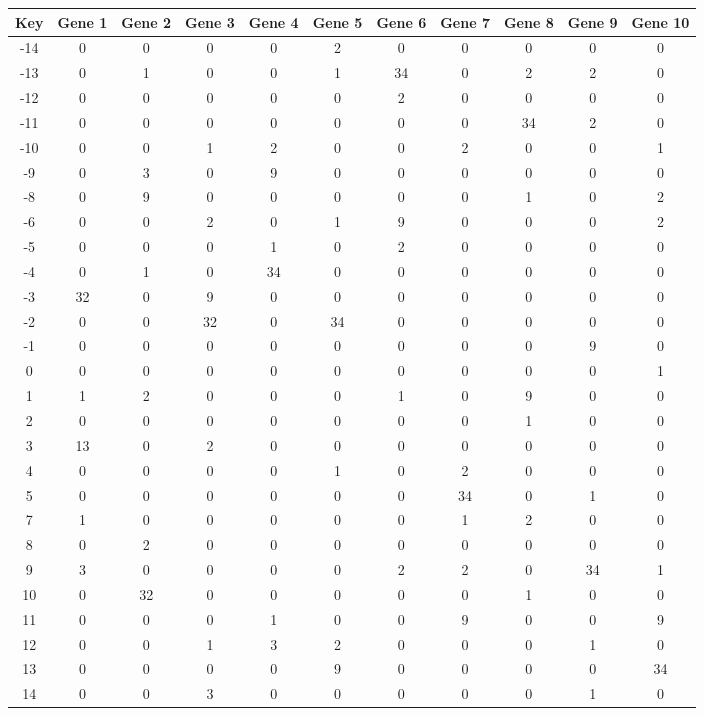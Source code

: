 \begin{tabular}{|c|c|c|c|c|c|c|c|c|c|c|}
\hline
Key & Gene 1 & Gene 2 & Gene 3 & Gene 4 & Gene 5 & Gene 6 & Gene 7 & Gene 8 & Gene 9 & Gene 10 \\
\hline
-14 & 0 & 0 & 0 & 0 & 2 & 0 & 0 & 0 & 0 & 0 \\
-13 & 0 & 1 & 0 & 0 & 1 & 34 & 0 & 2 & 2 & 0 \\
-12 & 0 & 0 & 0 & 0 & 0 & 2 & 0 & 0 & 0 & 0 \\
-11 & 0 & 0 & 0 & 0 & 0 & 0 & 0 & 34 & 2 & 0 \\
-10 & 0 & 0 & 1 & 2 & 0 & 0 & 2 & 0 & 0 & 1 \\
-9 & 0 & 3 & 0 & 9 & 0 & 0 & 0 & 0 & 0 & 0 \\
-8 & 0 & 9 & 0 & 0 & 0 & 0 & 0 & 1 & 0 & 2 \\
-6 & 0 & 0 & 2 & 0 & 1 & 9 & 0 & 0 & 0 & 2 \\
-5 & 0 & 0 & 0 & 1 & 0 & 2 & 0 & 0 & 0 & 0 \\
-4 & 0 & 1 & 0 & 34 & 0 & 0 & 0 & 0 & 0 & 0 \\
-3 & 32 & 0 & 9 & 0 & 0 & 0 & 0 & 0 & 0 & 0 \\
-2 & 0 & 0 & 32 & 0 & 34 & 0 & 0 & 0 & 0 & 0 \\
-1 & 0 & 0 & 0 & 0 & 0 & 0 & 0 & 0 & 9 & 0 \\
0 & 0 & 0 & 0 & 0 & 0 & 0 & 0 & 0 & 0 & 1 \\
1 & 1 & 2 & 0 & 0 & 0 & 1 & 0 & 9 & 0 & 0 \\
2 & 0 & 0 & 0 & 0 & 0 & 0 & 0 & 1 & 0 & 0 \\
3 & 13 & 0 & 2 & 0 & 0 & 0 & 0 & 0 & 0 & 0 \\
4 & 0 & 0 & 0 & 0 & 1 & 0 & 2 & 0 & 0 & 0 \\
5 & 0 & 0 & 0 & 0 & 0 & 0 & 34 & 0 & 1 & 0 \\
7 & 1 & 0 & 0 & 0 & 0 & 0 & 1 & 2 & 0 & 0 \\
8 & 0 & 2 & 0 & 0 & 0 & 0 & 0 & 0 & 0 & 0 \\
9 & 3 & 0 & 0 & 0 & 0 & 2 & 2 & 0 & 34 & 1 \\
10 & 0 & 32 & 0 & 0 & 0 & 0 & 0 & 1 & 0 & 0 \\
11 & 0 & 0 & 0 & 1 & 0 & 0 & 9 & 0 & 0 & 9 \\
12 & 0 & 0 & 1 & 3 & 2 & 0 & 0 & 0 & 1 & 0 \\
13 & 0 & 0 & 0 & 0 & 9 & 0 & 0 & 0 & 0 & 34 \\
14 & 0 & 0 & 3 & 0 & 0 & 0 & 0 & 0 & 1 & 0 \\
\hline
\end{tabular}